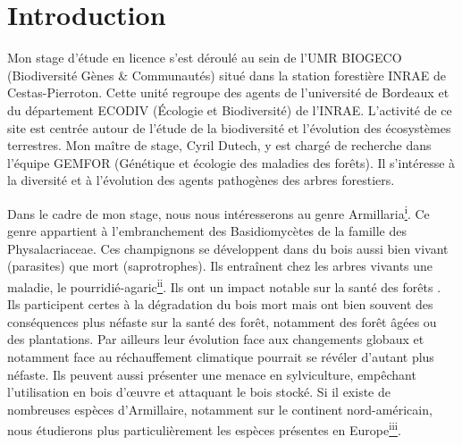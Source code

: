 
\doublespacing

\section{Introduction}

Mon stage d'étude en licence s'est déroulé au sein de l’UMR BIOGECO (Biodiversité Gènes \& Communautés) situé dans la station forestière INRAE de Cestas-Pierroton. Cette unité regroupe des agents de l'université de Bordeaux et du département ECODIV (Écologie et Biodiversité) de l’INRAE. L’activité de ce site est centrée autour de l’étude de la biodiversité et l'évolution des écosystèmes terrestres. Mon maître de stage, Cyril Dutech, y est chargé de recherche dans l’équipe GEMFOR (Génétique et écologie des maladies des forêts). Il s’intéresse à la diversité et à l'évolution des agents pathogènes des arbres forestiers.

Dans le cadre de mon stage, nous nous intéresserons au genre Armillaria\hyperref[bib:biblioI]{\textsuperscript{i}}.  Ce genre appartient à l'embranchement des Basidiomycètes de la famille des Physalacriaceae. Ces champignons se développent dans du bois aussi bien vivant (parasites) que mort (saprotrophes). Ils entraînent chez les arbres vivants une maladie, le pourridié-agaric\hyperref[bib:biblioII]{\textsuperscript{ii}}. Ils ont un impact notable sur la santé des forêts \cite{Shaw1991}. Ils participent certes à la dégradation du bois mort mais ont bien souvent des conséquences plus néfaste sur la santé des forêt, notamment des forêt âgées ou des plantations. Par ailleurs leur évolution face aux changements globaux et notamment face au réchauffement climatique \cite{Labbe2017} pourrait se révéler d'autant plus néfaste. Ils peuvent aussi présenter une menace en sylviculture, empêchant l'utilisation en bois d'\oe uvre et attaquant le bois stocké. Si il existe de nombreuses espèces d'Armillaire, notamment sur le continent nord-américain, nous étudierons plus particulièrement les espèces présentes en Europe\hyperref[bib:biblioIII]{\textsuperscript{iii}}.

